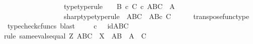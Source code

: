\begin{isabellebody}
\ \ \ \ \ \ \ \ \ \ \ \ \ \ \ \ \ {\isasympsi}{\isacharunderscore}{\kern0pt}type{\isacharbrackleft}{\kern0pt}type{\isacharunderscore}{\kern0pt}rule{\isacharbrackright}{\kern0pt}{\isacharcolon}{\kern0pt}\ {\isachardoublequoteopen}{\isasympsi}\ {\isacharcolon}{\kern0pt}\ \ {\isacharparenleft}{\kern0pt}B\ {\isasymtimes}\isactrlsub c\ C{\isacharparenright}{\kern0pt}\ {\isasymtimes}\isactrlsub c\ {\isacharparenleft}{\kern0pt}{\isacharparenleft}{\kern0pt}A\isactrlbsup B\isactrlesup {\isacharparenright}{\kern0pt}\isactrlbsup C\isactrlesup {\isacharparenright}{\kern0pt}\ {\isasymrightarrow}\ A{\isachardoublequoteclose}\ \isanewline
\ \ \ \ \ \ \ \ \ \ \ \ \ \ \ \ \ {\isasympsi}sharp{\isacharunderscore}{\kern0pt}type{\isacharbrackleft}{\kern0pt}type{\isacharunderscore}{\kern0pt}rule{\isacharbrackright}{\kern0pt}{\isacharcolon}{\kern0pt}\ {\isachardoublequoteopen}{\isasympsi}\isactrlsup {\isasymsharp}{\isacharcolon}{\kern0pt}\ {\isacharparenleft}{\kern0pt}A\isactrlbsup B\isactrlesup {\isacharparenright}{\kern0pt}\isactrlbsup C\isactrlesup \ {\isasymrightarrow}\ {\isacharparenleft}{\kern0pt}A\isactrlbsup {\isacharparenleft}{\kern0pt}B{\isasymtimes}\isactrlsub c\ C{\isacharparenright}{\kern0pt}\isactrlesup {\isacharparenright}{\kern0pt}{\isachardoublequoteclose}\isanewline
\ \ \ \ \isamarkupfalse%
\ transpose{\isacharunderscore}{\kern0pt}func{\isacharunderscore}{\kern0pt}type\ \isamarkupfalse%
\ {\isacharparenleft}{\kern0pt}typecheck{\isacharunderscore}{\kern0pt}cfuncs{\isacharcomma}{\kern0pt}\ blast{\isacharparenright}{\kern0pt}\isanewline
\isanewline
\ \ \isamarkupfalse%
\ {\isachardoublequoteopen}{\isasymphi}\isactrlsup {\isasymsharp}\isactrlsup {\isasymsharp}\ {\isasymcirc}\isactrlsub c\ {\isasympsi}\isactrlsup {\isasymsharp}\ {\isacharequal}{\kern0pt}\ id{\isacharparenleft}{\kern0pt}{\isacharparenleft}{\kern0pt}A\isactrlbsup B\isactrlesup {\isacharparenright}{\kern0pt}\isactrlbsup C\isactrlesup {\isacharparenright}{\kern0pt}{\isachardoublequoteclose}\isanewline
\ \ \isamarkupfalse%
{\isacharparenleft}{\kern0pt}rule\ same{\isacharunderscore}{\kern0pt}evals{\isacharunderscore}{\kern0pt}equal{\isacharbrackleft}{\kern0pt}\ Z{\isacharequal}{\kern0pt}\ {\isachardoublequoteopen}{\isacharparenleft}{\kern0pt}{\isacharparenleft}{\kern0pt}A\isactrlbsup B\isactrlesup {\isacharparenright}{\kern0pt}\isactrlbsup C\isactrlesup {\isacharparenright}{\kern0pt}{\isachardoublequoteclose}{\isacharcomma}{\kern0pt}\ \ X\ {\isacharequal}{\kern0pt}\ {\isachardoublequoteopen}{\isacharparenleft}{\kern0pt}A\isactrlbsup B\isactrlesup {\isacharparenright}{\kern0pt}{\isachardoublequoteclose}{\isacharcomma}{\kern0pt}\ \ A\ {\isacharequal}{\kern0pt}\ {\isachardoublequoteopen}C{\isachardoublequoteclose}{\isacharbrackright}{\kern0pt}{\isacharparenright}{\kern0pt}\isanewline

\end{isabellebody}
